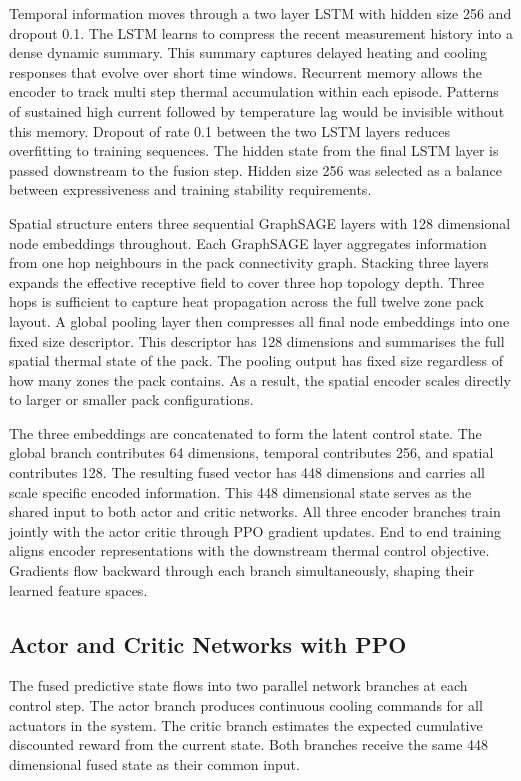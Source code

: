 \documentclass[twocolumn]{article}
\begin{document}
Temporal information moves through a two layer LSTM with hidden size 256 and dropout 0.1. The LSTM learns to compress the recent measurement history into a dense dynamic summary. This summary captures delayed heating and cooling responses that evolve over short time windows. Recurrent memory allows the encoder to track multi step thermal accumulation within each episode. Patterns of sustained high current followed by temperature lag would be invisible without this memory. Dropout of rate 0.1 between the two LSTM layers reduces overfitting to training sequences. The hidden state from the final LSTM layer is passed downstream to the fusion step. Hidden size 256 was selected as a balance between expressiveness and training stability requirements.

Spatial structure enters three sequential GraphSAGE layers with 128 dimensional node embeddings throughout. Each GraphSAGE layer aggregates information from one hop neighbours in the pack connectivity graph. Stacking three layers expands the effective receptive field to cover three hop topology depth. Three hops is sufficient to capture heat propagation across the full twelve zone pack layout. A global pooling layer then compresses all final node embeddings into one fixed size descriptor. This descriptor has 128 dimensions and summarises the full spatial thermal state of the pack. The pooling output has fixed size regardless of how many zones the pack contains. As a result, the spatial encoder scales directly to larger or smaller pack configurations.

The three embeddings are concatenated to form the latent control state. The global branch contributes 64 dimensions, temporal contributes 256, and spatial contributes 128. The resulting fused vector has 448 dimensions and carries all scale specific encoded information. This 448 dimensional state serves as the shared input to both actor and critic networks. All three encoder branches train jointly with the actor critic through PPO gradient updates. End to end training aligns encoder representations with the downstream thermal control objective. Gradients flow backward through each branch simultaneously, shaping their learned feature spaces.

\subsection*{Actor and Critic Networks with PPO}

The fused predictive state flows into two parallel network branches at each control step. The actor branch produces continuous cooling commands for all actuators in the system. The critic branch estimates the expected cumulative discounted reward from the current state. Both branches receive the same 448 dimensional fused state as their common input.
\end{document}
